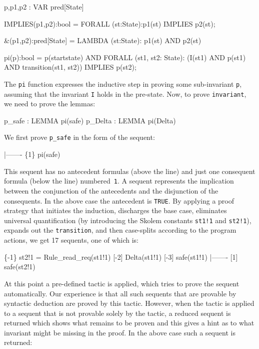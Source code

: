 \begin{smallsession}
  p,p1,p2 : VAR pred[State]

  IMPLIES(p1,p2):bool =
    FORALL (st:State):p1(st) IMPLIES p2(st);

  &(p1,p2):pred[State] =
    LAMBDA (st:State): p1(st) AND p2(st)

  pi(p):bool =
    p(startstate)
      AND 
    FORALL (st1, st2: State): 
      (I(st1) AND p(st1) AND transition(st1, st2)) IMPLIES p(st2);
\end{smallsession}

The {\tt pi}  function expresses the  inductive  step in proving  some
sub-invariant {\tt  p}, assuming that the invariant   {\tt I} holds in
the  pre-state.  Now, to prove  {\tt  invariant}, we  need  to prove the
lemmas:

\begin{smallsession}
  p_safe  : LEMMA pi(safe)
  p_Delta : LEMMA pi(Delta)
\end{smallsession}

We first  prove {\tt p\_safe} in the form of the sequent: 
\begin{smallsession}
    |-------
  \{1\}   pi(safe)
\end{smallsession}

This sequent has no antecedent formulas (above the  line)  and just one
consequent formula (below the  line) numbered~{\tt 1}.   A  sequent
represents the implication  between the conjunction of the antecedents
and  the disjunction  of   the consequents.  In   the  above  case the
antecedent is {\tt TRUE}. 
By applying a proof strategy that initiates the induction, discharges the
base case, eliminates universal quantification (by introducing the Skolem
constants {\tt st1!1} and {\tt st2!1}),  expands out the
{\tt transition}, and then case-splits according to the program
actions, we get 17 sequents, one of which is:

\label{rule-sequent}
\begin{smallsession}
  \{-1\}   st2!1 = Rule_read_req(st1!1)
  [-2]   Delta(st1!1)
  [-3]   safe(st1!1)
    |-------
  [1]   safe(st2!1)
\end{smallsession}

At this point  a pre-defined tactic is applied,  which tries to  prove
the sequent  automatically.  Our experience  is that all such sequents
that  are   provable by  syntactic   deduction  are  proved   by  this
tactic. However,  when the tactic is applied  to a sequent that is not
provable solely by the tactic,  a reduced sequent  is returned which  shows what
remains to be proven and this gives a hint as  to what invariant might
be missing in the proof. In the above case such a sequent is returned:


